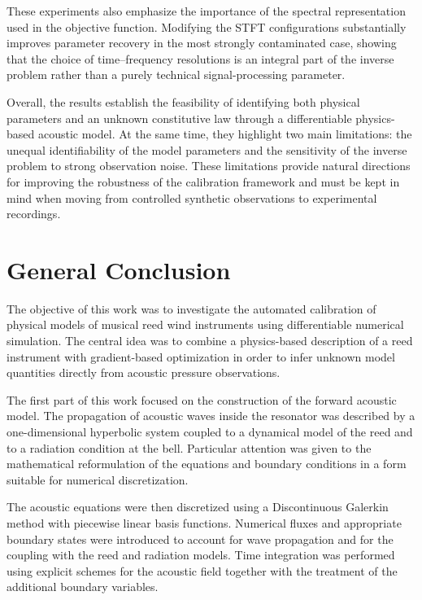 \documentclass[11pt,a4paper]{report}
\theoremstyle{plain}
\theoremstyle{definition}
\begin{document}
These experiments also emphasize the importance of the spectral representation
used in the objective function. Modifying the STFT configurations substantially
improves parameter recovery in the most strongly contaminated case, showing
that the choice of time--frequency resolutions is an integral part of the
inverse problem rather than a purely technical signal-processing parameter.

Overall, the results establish the feasibility of identifying both physical
parameters and an unknown constitutive law through a differentiable
physics-based acoustic model. At the same time, they highlight two main
limitations: the unequal identifiability of the model parameters and the
sensitivity of the inverse problem to strong observation noise. These
limitations provide natural directions for improving the robustness of the
calibration framework and must be kept in mind when moving from controlled
synthetic observations to experimental recordings.

\chapter{General Conclusion}

The objective of this work was to investigate the automated calibration of
physical models of musical reed wind instruments using differentiable numerical
simulation. The central idea was to combine a physics-based description of a
reed instrument with gradient-based optimization in order to infer unknown
model quantities directly from acoustic pressure observations.

The first part of this work focused on the construction of the forward acoustic
model. The propagation of acoustic waves inside the resonator was described by
a one-dimensional hyperbolic system coupled to a dynamical model of the reed
and to a radiation condition at the bell. Particular attention was given to
the mathematical reformulation of the equations and boundary conditions in a
form suitable for numerical discretization.

The acoustic equations were then discretized using a Discontinuous Galerkin
method with piecewise linear basis functions. Numerical fluxes and appropriate
boundary states were introduced to account for wave propagation and for the
coupling with the reed and radiation models. Time integration was performed
using explicit schemes for the acoustic field together with the treatment of
the additional boundary variables.
\end{document}
